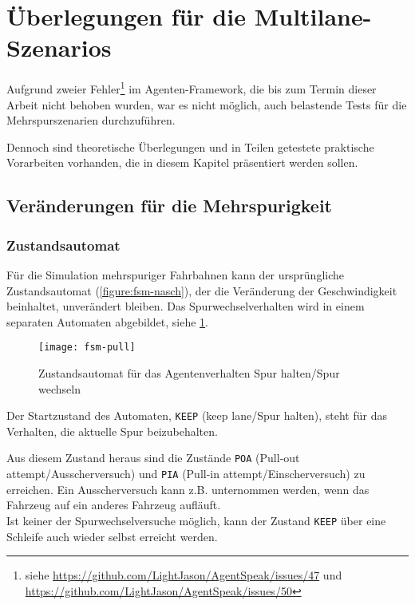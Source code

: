 \section{Überlegungen für die Multilane-Szenarios}
\label{sec:ueberlegungen-multilane}

Aufgrund zweier Fehler\footnote{siehe \url{https://github.com/LightJason/AgentSpeak/issues/47} und \url{https://github.com/LightJason/AgentSpeak/issues/50}} im Agenten-Framework, die bis zum Termin dieser Arbeit nicht behoben wurden, war es nicht möglich, auch belastende Tests für die Mehrspurszenarien durchzuführen.

Dennoch sind theoretische Überlegungen und in Teilen getestete praktische Vorarbeiten vorhanden, die in diesem Kapitel präsentiert werden sollen.






\subsection{Veränderungen für die Mehrspurigkeit}
\label{sec:multilane-change}


\subsubsection{Zustandsautomat}

Für die Simulation mehrspuriger Fahrbahnen kann der ursprüngliche Zustandsautomat (\cref{figure:fsm-nasch}), der die Veränderung der Geschwindigkeit beinhaltet, unverändert bleiben.
Das Spurwechselverhalten wird in einem separaten Automaten abgebildet, siehe \cref{figure:fsm-pull}.

\begin{figure}[hptb]
 \centering
 \texttt{[image: fsm-pull]}
 \caption[Zustandsautomat für das Spurverhalten]
 		{Zustandsautomat für das Agentenverhalten Spur halten/Spur wechseln}
 \label{figure:fsm-pull}
\end{figure}

Der Startzustand des Automaten, \texttt{KEEP} (keep lane/Spur halten), steht für das Verhalten, die aktuelle Spur beizubehalten.

Aus diesem Zustand heraus sind die Zustände \texttt{POA} (Pull-out attempt/Ausscherversuch) und \texttt{PIA} (Pull-in attempt/Einscherversuch) zu erreichen.
Ein Ausscherversuch kann z.B. unternommen werden, wenn das Fahrzeug auf ein anderes Fahrzeug aufläuft.
\\
Ist keiner der Spurwechselversuche möglich, kann der Zustand \texttt{KEEP} über eine Schleife auch wieder selbst erreicht werden.

